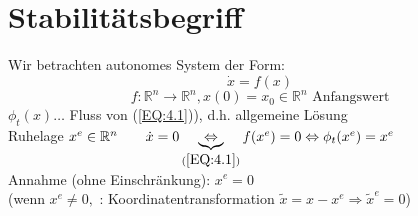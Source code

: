 \documentclass[ngerman]{tudscrreprt}
\begin{document}
\section{Stabilitätsbegriff}
Wir betrachten autonomes System der Form: \begin{equation}\dot x = f(x)\tag{4.1}
\label{EQ:4.1}
\end{equation}
\begin{equation*}
f: \mathbb{R}^n \rightarrow \mathbb{R}^n, x(0) = x_0 \in \mathbb{R}^n \text{ Anfangswert}
\end{equation*}
$\phi_t(x) \dots $ Fluss von (\ref{EQ:4.1})), d.h. allgemeine Lösung
\\Ruhelage $x^e \in \mathbb{R}^n \qquad 
\dot x = 0 \underbrace{\Leftrightarrow}_{(\ref{EQ:4.1})} f(x^e)= 0 \Leftrightarrow \phi_t(x^e)=x^e
$\\
Annahme (ohne Einschränkung): $x^e=0$\\
(wenn $x^e \ne 0, $ : Koordinatentransformation $\tilde x = x- x^e \Rightarrow \tilde x^e = 0 $)
\\
\end{document}
